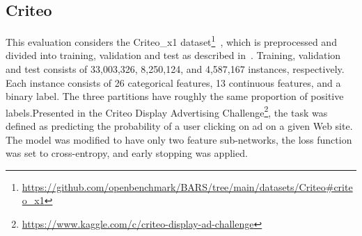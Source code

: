 \documentclass[manuscript,nonacm]{acmart}
\begin{document}
\subsection{Criteo}

This evaluation considers the Criteo\_x1 dataset\footnote{\url{https://github.com/openbenchmark/BARS/tree/main/datasets/Criteo\#criteo_x1}}~\cite{bars_ds}, which is preprocessed and divided into training, validation and test as described in~\cite{afn_criteo}. Training, validation and test consists of 33,003,326, 8,250,124, and 4,587,167 instances, respectively. Each instance consists of 26 categorical features, 13 continuous features, and a binary label. The three partitions have roughly the same proportion of positive labels.Presented in the Criteo Display Advertising Challenge\footnote{\url{https://www.kaggle.com/c/criteo-display-ad-challenge}}, the task was defined as predicting the probability of a user clicking on ad on a given Web site. The model was modified to have only two feature sub-networks, the loss function was set to cross-entropy, and early stopping was applied.

\begin{table}
    \centering
    \caption{Results obtained for the evaluated models for the Criteo dataset.}
    \label{tab:results-criteo}\vspace{-1.0cm}
\end{table}
\end{document}
